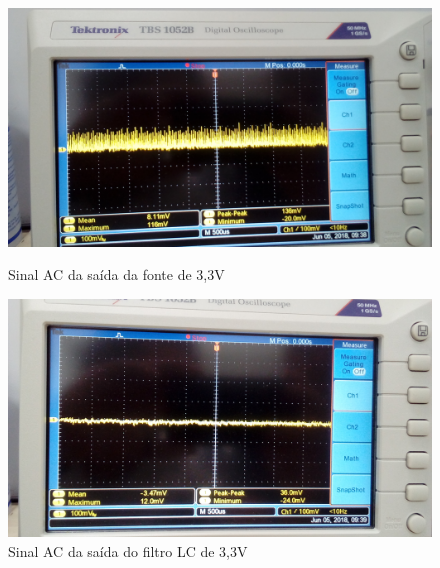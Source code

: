 \documentclass[
	12pt,				%
	openright,			%
	twoside,			%
	a4paper,			%
	english,			%
	french,				%
	spanish,			%
	brazil,				%
	]{abntex2}
\begin{document}
			\begin{figure}[!ht]
				\centering
				\begin{minipage}{0.4\linewidth}
					\centering
					\includegraphics[width = \linewidth]{../Fotos/antesFiltro33.jpg}
					\caption{Sinal AC da saída da fonte de 3,3V}
				\end{minipage}
				\hfill\vline\hfill
				\begin{minipage}{0.4\linewidth}
					\centering
					\includegraphics[width = \linewidth]{../Fotos/depoisFiltro33.jpg}
					\caption{Sinal AC da saída do filtro LC de 3,3V}
				\end{minipage}
			\end{figure}
\end{document}
